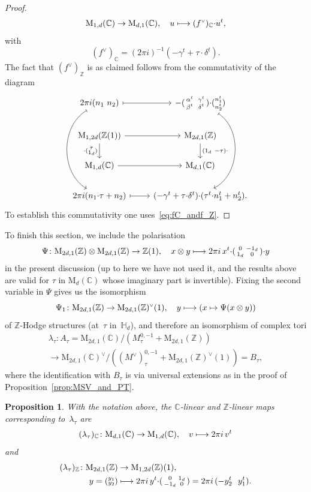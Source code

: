 \documentclass[11pt]{article}
\providecommand{\C}{}
\def\mto{\mathchoice{\longmapsto}{\mapsto}{\mapsto}{\mapsto}}
\let\oldvee\vee
\renewcommand{\vee}{{\scriptscriptstyle\oldvee}}
\theoremstyle{plain}
\newtheorem{Proposition}[subsection]{Proposition}
\theoremstyle{definition}
\numberwithin{equation}{subsection}
\renewcommand{\C}{\mathbb C}
\newcommand{\Z}{\mathbb Z}
\renewcommand{\H}{\mathbb H}
\newcommand{\rmM}{\mathrm{M}}
\begin{document}
\begin{proof}
\[
\rmM_{1,d}(\C)\to\rmM_{d,1}(\C), \quad u\mto
(f^\vee)_\C{\cdot}u^t,
\]
with
\[
(f^\vee)_\C = (2\pi i)^{-1} (-\gamma^t + \tau{\cdot}\delta^t).
\]
The fact that $(f^\vee)_\Z$ is as claimed follows from the
commutativity of the diagram
\[
\begin{tikzcd}
2\pi i(n_1\ n_2) \ar[r, mapsto] \ar[ddd, mapsto, bend right=60] &
-(\begin{smallmatrix} \alpha^t & \gamma^t\\ \beta^t &
\delta^t\end{smallmatrix})
{\cdot}(\substack{n_1^t\\ n_2^t}) \ar[ddd, mapsto, bend left=60]\\
\rmM_{1,2d}(\Z(1)) \ar[r] \ar[d,"{\cdot}(\substack{\tau\\ 1_d})"'] &
\rmM_{2d,1}(\Z) \ar[d,"(1_d\ -\tau){\cdot}"] \\
\rmM_{1,d}(\C) \ar[r] & \rmM_{d,1}(\C)\\
2\pi i (n_1{\cdot}\tau + n_2)\ar[r,mapsto] &
(-\gamma^t + \tau{\cdot}\delta^t){\cdot}(\tau^t{\cdot}n_1^t+n_2^t).
\end{tikzcd}
\]
To establish this commutativity one uses~\eqref{eq:fC_andf_Z}.
\end{proof}
To finish this section, we include the polarisation
\[
\Psi\colon \rmM_{2d,1}(\Z)\otimes\rmM_{2d,1}(\Z)\to\Z(1), \quad
x\otimes y\mto 2\pi i\,x^t{\cdot}(\begin{smallmatrix} 0 & -1_d\\ 1_d &
0\end{smallmatrix}){\cdot}y
\]
in the present discussion (up to here we have not used it, and the
results above are valid for $\tau$
in $\rmM_d(\C)$ whose imaginary part is invertible). Fixing the
second variable in $\Psi$ gives us the isomorphism
\[
\Psi_1\colon \rmM_{2d,1}(\Z) \to \rmM_{2d,1}(\Z)^\vee(1),\quad
y\mto \left( x\mapsto \Psi(x\otimes y)\right)
\]
of $\Z$-Hodge structures (at~$\tau$ in~$\H_d$), and therefore an
isomorphism of complex tori
\begin{multline*}
\lambda_\tau\colon
A_\tau = \rmM_{2d,1}(\C)/(M^{0,-1}_\tau+\rmM_{2d,1}(\Z))\\
\to
\rmM_{2d,1}(\C)^\vee/((M^\vee)^{0,-1}_\tau+\rmM_{2d,1}(\Z)^\vee(1))=B_\tau,
\end{multline*}
where the identification with $B_\tau$ is via universal
extensions as in the proof of Proposition~\ref{prop:MSV_and_PT}.
\begin{Proposition}\label{prop:pol_Z_and_C}
With the notation above, the $\C$-linear and $\Z$-linear maps
corresponding to~$\lambda_\tau$ are
\[
(\lambda_\tau)_\C\colon \rmM_{d,1}(\C)\to\rmM_{1,d}(\C),\quad v\mto 2\pi i\, v^t
\]
and
\[
\begin{aligned}
(\lambda_\tau)_\Z\colon \rmM_{2d,1}(\Z) & \to\rmM_{1,2d}(\Z)(1),\\
y=(\substack{y_1\\ y_2}) & \mto
2\pi i\, y^t{\cdot}(\begin{smallmatrix}0 & 1_d\\-1_d &
0\end{smallmatrix}) = 2\pi i\, (-y_2^t\ \ y_1^t).
\end{aligned}
\]
\end{Proposition}
\end{document}
